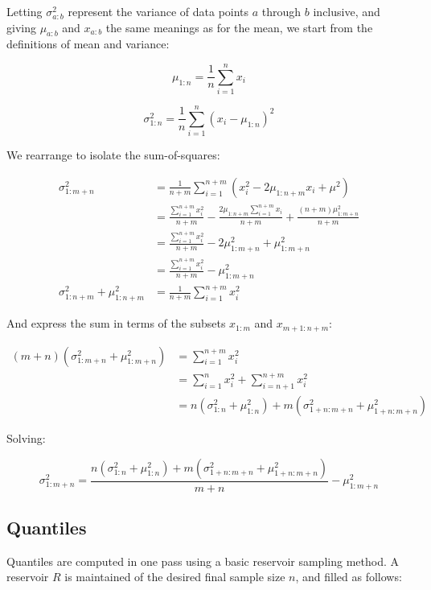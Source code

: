 \documentclass[a4paper]{article}
\begin{document}
Letting \(\sigma_{a:b}^2\) represent the variance of data points \(a\)
through \(b\) inclusive, and giving \(\mu_{a:b}\) and \(x_{a:b}\) the
same meanings as for the mean, we start from the definitions of mean and
variance:

\[\mu_{1:n} = \frac{1}{n} \sum\limits_{i=1}^n x_i\]

\[\sigma_{1:n}^2 = \frac{1}{n} \sum\limits_{i=1}^n (x_i - \mu_{1:n})^2\]

We rearrange to isolate the sum-of-squares:

\[\begin{aligned}\sigma_{1:m+n}^2 &= \frac{1}{n+m} \sum\limits_{i=1}^{n+m} (x_i^2 - 2\mu_{1:n+m}x_i + \mu^2) \\
  &= \frac{\sum\limits_{i=1}^{n+m} x_i^2}{n+m} - \frac{2\mu_{1:n+m}\sum\limits_{i=1}^{n+m} x_i}{n+m} + \frac{(n + m)\mu_{1:m+n}^2}{n+m} \\
  &= \frac{\sum\limits_{i=1}^{n+m} x_i^2}{n+m} - 2\mu_{1:m+n}^2 + \mu_{1:m+n}^2 \\
  &= \frac{\sum\limits_{i=1}^{n+m} x_i^2}{n+m} - \mu_{1:m+n}^2 \\
  \sigma_{1:n+m}^2 + \mu_{1:n+m}^2 &= \frac{1}{n+m} \sum\limits_{i=1}^{n+m} x_i^2\end{aligned}\]

And express the sum in terms of the subsets \(x_{1:m}\) and
\(x_{m+1:n+m}\):

\[\begin{aligned}(m + n)(\sigma_{1:m+n}^2 + \mu_{1:m+n}^2) &= \sum\limits_{i=1}^{n+m} x_i^2 \\
  &= \sum_{i=1}^n x_i^2 + \sum_{i=n+1}^{n+m} x_i^2 \\
  &= n(\sigma^2_{1:n} + \mu_{1:n}^2) + m(\sigma_{1+n:m+n}^2 + \mu_{1+n:m+n}^2)\end{aligned}\]

Solving:

\[\sigma_{1:m+n}^2 = \frac{n(\sigma_{1:n}^2 + \mu_{1:n}^2) + m(\sigma_{1+n:m+n}^2 + \mu_{1+n:m+n}^2)}{m+n} - \mu_{1:m+n}^2\]

\subsection{Quantiles}\label{quantiles}

Quantiles are computed in one pass using a basic reservoir
sampling\cite{vitter1985}\cite[pp.~144-145]{Knuth1997} method. A reservoir \(R\) is maintained of
the desired final sample size \(n\), and filled as follows:
\end{document}
